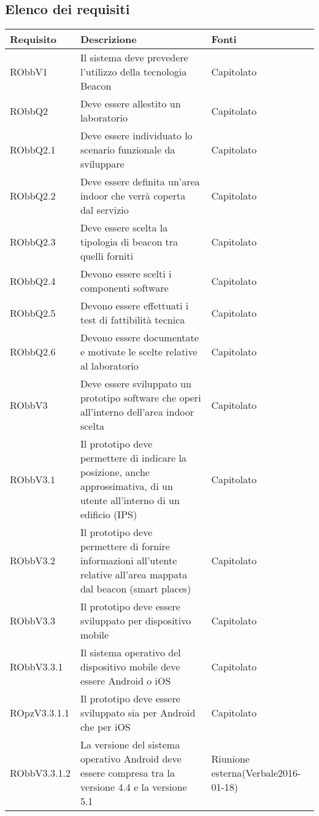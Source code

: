 \documentclass[../AnalisiDeiRequisiti.tex]{subfiles}
\begin{document}
	\subsection{Elenco dei requisiti}
		\begin{longtabu} to \textwidth {X X[2] X}
\toprule
\textbf{Requisito} & \textbf{Descrizione} & \textbf{Fonti}\\
\midrule
\endhead
{}
\midrule 
RObbV1 & Il sistema deve prevedere l'utilizzo della tecnologia Beacon & Capitolato \\ 
\midrule 
RObbQ2 & Deve essere allestito un laboratorio & Capitolato \\ 
\midrule 
RObbQ2.1 & Deve essere individuato lo scenario funzionale da sviluppare & Capitolato \\ 
\midrule 
RObbQ2.2 & Deve essere definita un'area indoor che verrà coperta dal servizio & Capitolato \\ 
\midrule 
RObbQ2.3 & Deve essere scelta la tipologia di beacon tra quelli forniti & Capitolato \\ 
\midrule 
RObbQ2.4 & Devono essere scelti i componenti software & Capitolato \\ 
\midrule 
RObbQ2.5 & Devono essere effettuati i test di fattibilità tecnica & Capitolato \\ 
\midrule 
RObbQ2.6 & Devono essere documentate e motivate le scelte relative al laboratorio & Capitolato \\ 
\midrule 
RObbV3 & Deve essere sviluppato un prototipo software che operi all'interno dell'area indoor scelta & Capitolato \\ 
\midrule 
RObbV3.1 & Il prototipo deve permettere di indicare la posizione, anche approssimativa, di un utente all'interno di un edificio (IPS) & Capitolato \\ 
\midrule 
RObbV3.2 & Il prototipo deve permettere di fornire informazioni all'utente relative all'area mappata dal beacon (smart places) & Capitolato \\ 
\midrule 
RObbV3.3 & Il prototipo deve essere sviluppato per dispositivo mobile & Capitolato \\ 
\midrule 
RObbV3.3.1 & Il sistema operativo del dispositivo mobile deve essere Android o iOS & Capitolato \\ 
\midrule 
ROpzV3.3.1.1 & Il prototipo deve essere sviluppato sia per Android che per iOS & Capitolato \\ 
\midrule 
RObbV3.3.1.2 & La versione del sistema operativo Android deve essere compresa tra la versione 4.4 e la versione 5.1 & Riunione esterna(Verbale2016-01-18) \\ 

\end{longtabu}
\end{document}
